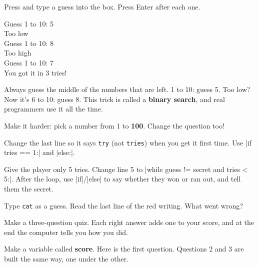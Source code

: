 Press \playbtn{} and type a guess into the box. Press Enter after each one.

\begin{outputbox}
Guess 1 to 10: 5\\
Too low\\
Guess 1 to 10: 8\\
Too high\\
Guess 1 to 10: 7\\
You got it in 3 tries!
\end{outputbox}

\begin{think}
Always guess the middle of the numbers that are left. 1 to 10: guess 5. Too low? Now it's 6 to 10: guess 8. This trick is called a \textbf{binary search}, and real programmers use it all the time.
\end{think}

\begin{challenge}
\tick Make it harder: pick a number from 1 to \textbf{100}. Change the question too!\par
\tick Change the last line so it says \texttt{try} (not \texttt{tries}) when you get it first time. Use \py|if tries == 1:| and \py|else:|.\par
\tick Give the player only 5 tries. Change line 5 to \py|while guess != secret and tries < 5:|. After the loop, use \py|if|/\py|else| to say whether they won or ran out, and tell them the secret.\par
\tick Type \texttt{cat} as a guess. Read the last line of the red writing. What went wrong?
\end{challenge}


Make a three-question quiz. Each right answer adds one to your score, and at the end the computer tells you how you did.

Make a variable called \textbf{score}. Here is the first question. Questions 2 and 3 are built the same way, one under the other.

\begin{center}
\begin{scratch}
\blockspace[0.6]
\end{scratch}
\end{center}

